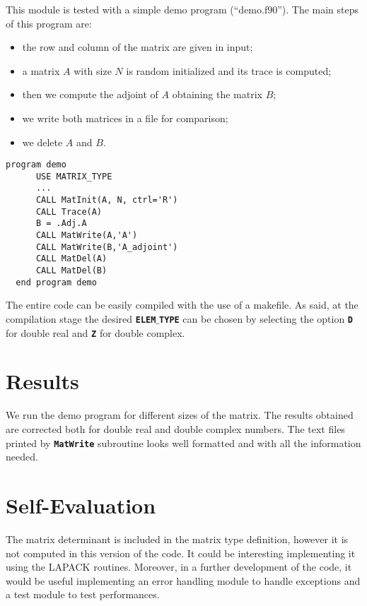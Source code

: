 \documentclass[rmp,10pt,onecolumn,fleqn,notitlepage]{revtex4-1}
\begin{document}
This module is tested with a simple demo program (“demo.f90”). The main steps of this program are:
\begin{center}
  \begin{minipage}[t]{0.43\linewidth}%

      \begin{itemize}
      \item the row and column of the matrix are given in input;
      \item a matrix \( A \) with size \( N \) is random initialized and its trace is computed;
      \item then we compute the adjoint of \( A \) obtaining the matrix \( B \);
      \item we write both matrices in a file for comparison;
      \item we delete \( A \) and \( B \).
      \end{itemize}

  \end{minipage}
  \hspace{0.8cm}
  \begin{minipage}[t]{0.49\linewidth}%
  \begin{lstlisting}[style=Fortran]
  program demo
      USE MATRIX_TYPE
      ...
      CALL MatInit(A, N, ctrl='R')
      CALL Trace(A)
      B = .Adj.A
      CALL MatWrite(A,'A')
      CALL MatWrite(B,'A_adjoint')
      CALL MatDel(A)
      CALL MatDel(B)
  end program demo
\end{lstlisting}
  \end{minipage}
\end{center}

The entire code can be easily compiled with the use of a makefile. As said, at the compilation stage the desired {\bfseries\texttt{ELEM}$\_$\texttt{TYPE}} can be chosen by selecting the option {\bfseries\texttt{D}} for double real and {\bfseries\texttt{Z}} for double complex.


\section{Results}
We run the demo program for different sizes of the matrix. The results obtained are corrected both for double real and double complex numbers. The text files printed by {\bfseries\texttt{MatWrite}} subroutine looks well formatted and with all the information needed.


\section{Self-Evaluation}
The matrix determinant is included in the matrix type definition, however it is not computed in this version of the code. It could be interesting implementing it using the LAPACK routines.
Moreover, in a further development of the code, it would be useful implementing an error handling module to handle exceptions and a test module to test performances.


%
\end{document}
